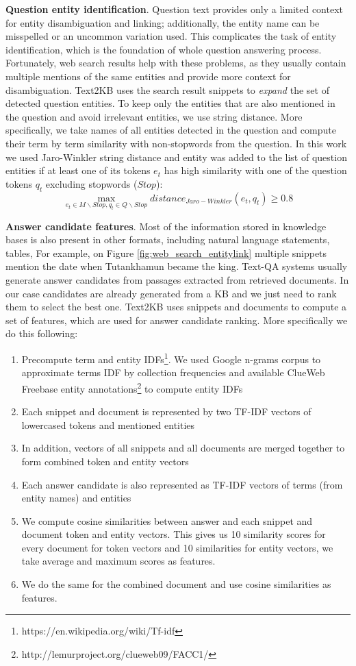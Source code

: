 \textbf{Question entity identification}.
Question text provides only a limited context for entity disambiguation and linking; additionally, the entity name can be misspelled or an uncommon variation used.
This complicates the task of entity identification, which is the foundation of whole question answering process.
Fortunately, web search results help with these problems, as they usually contain multiple mentions of the same entities and provide more context for disambiguation.
Text2KB uses the search result snippets to {\em expand} the set of detected question entities.
To keep only the entities that are also mentioned in the question and avoid irrelevant entities, we use string distance.
More specifically, we take names of all entities detected in the question and compute their term by term similarity with non-stopwords from the question.
In this work we used Jaro-Winkler string distance and entity was added to the list of question entities if at least one of its tokens $e_t$ has high similarity with one of the question tokens $q_t$ excluding stopwords ($Stop$):
$$\max_{e_t \in M\backslash Stop, q_t \in Q\backslash Stop} distance_{Jaro-Winkler}(e_t, q_t) \geq 0.8$$

\textbf{Answer candidate features}.
Most of the information stored in knowledge bases is also present in other formats, including natural language statements, tables, \etc
For example, on Figure \ref{fig:web_search_entitylink} multiple snippets mention the date when Tutankhamun became the king.
Text-QA systems usually generate answer candidates from passages extracted from retrieved documents.
In our case candidates are already generated from a KB and we just need to rank them to select the best one.
Text2KB uses snippets and documents to compute a set of features, which are used for answer candidate ranking.
More specifically we do this following:

\vspace{-0.2cm}
\begin{enumerate}
\setlength\itemsep{-0.5em}
\item Precompute term and entity IDFs\footnote{https://en.wikipedia.org/wiki/Tf-idf}. We used Google n-grams corpus to approximate terms IDF by collection frequencies and available ClueWeb Freebase entity annotations\footnote{http://lemurproject.org/clueweb09/FACC1/} to compute entity IDFs
\item Each snippet and document is represented by two TF-IDF vectors of lowercased tokens and mentioned entities
\item In addition, vectors of all snippets and all documents are merged together to form combined token and entity vectors
\item Each answer candidate is also represented as TF-IDF vectors of terms (from entity names) and entities
\item We compute cosine similarities between answer and each snippet and document token and entity vectors. This gives us 10 similarity scores for every document for token vectors and 10 similarities for entity vectors, we take average and maximum scores as features.
\item We do the same for the combined document and use cosine similarities as features.
\end{enumerate}

